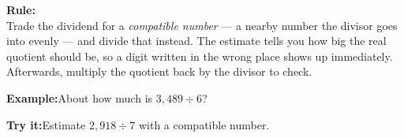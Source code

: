 \documentclass[12pt]{article}
\begin{document}
\begin{formulabox}\textbf{Rule:}\\[3pt]
Trade the dividend for a \emph{compatible number} --- a nearby number the
divisor goes into evenly --- and divide that instead. The estimate tells you how
big the real quotient should be, so a digit written in the wrong place shows up
immediately. Afterwards, multiply the quotient back by the divisor to check.
\end{formulabox}
\begin{examplebox}\textbf{Example:}\quad About how much is $3{,}489 \div 6$?
\end{examplebox}
\begin{tryitbox}\textbf{Try it:}\quad Estimate $2{,}918 \div 7$ with a compatible number.\\[2pt]
\end{tryitbox}
\end{document}
